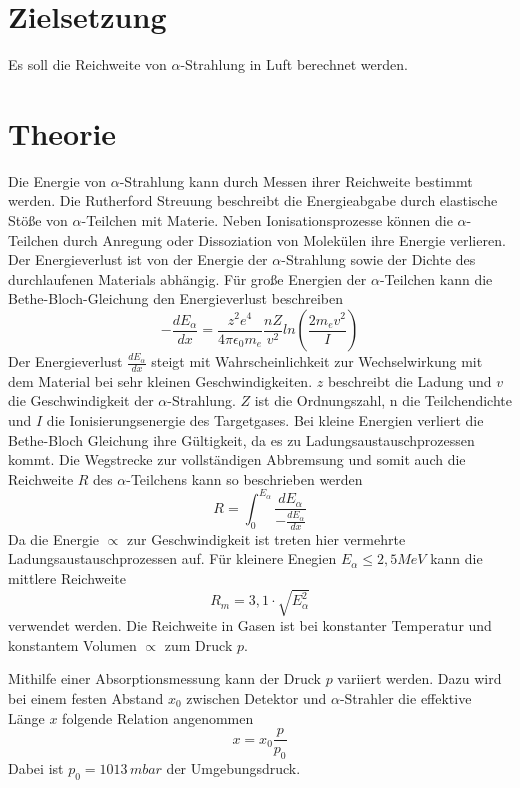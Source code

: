 \section{Zielsetzung}
Es soll die Reichweite von $\alpha$-Strahlung in Luft berechnet werden.
\section{Theorie}
Die Energie von $\alpha$-Strahlung kann durch Messen ihrer Reichweite bestimmt werden.
Die Rutherford Streuung beschreibt die Energieabgabe durch elastische Stöße von
$\alpha$-Teilchen mit Materie.
Neben Ionisationsprozesse können die $\alpha$-Teilchen durch Anregung oder
Dissoziation von Molekülen ihre Energie verlieren.
Der Energieverlust ist von der Energie der $\alpha$-Strahlung sowie der Dichte
des durchlaufenen Materials abhängig.
Für große Energien der $\alpha$-Teilchen kann die Bethe-Bloch-Gleichung
den Energieverlust beschreiben
\begin{equation*}
  -\frac{dE_{\alpha}}{dx} = \frac{z^2 e^4}{4 \pi \epsilon_0 m_e}\frac{nZ}{v^2} ln(\frac{2m_e v^2}{I})
  \label{eq:1}
\end{equation*}
Der Energieverlust $\frac{dE_{\alpha}}{dx}$ steigt mit Wahrscheinlichkeit zur Wechselwirkung mit
dem Material bei sehr kleinen Geschwindigkeiten.
$z$ beschreibt die Ladung und $v$ die Geschwindigkeit der $\alpha$-Strahlung.
$Z$ ist die Ordnungszahl, n die Teilchendichte und $I$ die Ionisierungsenergie
des Targetgases. Bei kleine Energien verliert die Bethe-Bloch Gleichung ihre Gültigkeit,
da es zu Ladungsaustauschprozessen kommt.
Die Wegstrecke zur vollständigen Abbremsung
und somit auch die Reichweite $R$ des $\alpha$-Teilchens
kann so beschrieben werden
\begin{equation*}
  R = \int_{0}^{E_{\alpha}} \frac{dE_\alpha}{-\frac{dE_{\alpha}}{dx}}
  \label{eq:2}
\end{equation*}
Da die Energie $\propto $ zur Geschwindigkeit ist treten hier vermehrte Ladungsaustauschprozessen auf.
Für kleinere Enegien $E_\alpha \leq 2,5 MeV$ kann die mittlere Reichweite
\begin{equation}
  R_m= 3,1 \cdot \sqrt{E^2_\alpha}
  \label{eq:3}
\end{equation}
verwendet werden.
Die Reichweite in Gasen ist bei konstanter Temperatur und konstantem Volumen $\propto$ zum Druck $p$.

Mithilfe einer Absorptionsmessung kann der Druck $p$ variiert werden. Dazu
wird bei einem festen Abstand $x_0$ zwischen Detektor und $\alpha$-Strahler die
effektive Länge $x$ folgende Relation angenommen
\begin{equation}
  x = x_0 \frac{p}{p_0}
  \label{eq:4}
\end{equation}
Dabei ist $p_0 = 1013 \, mbar$ der Umgebungsdruck.
